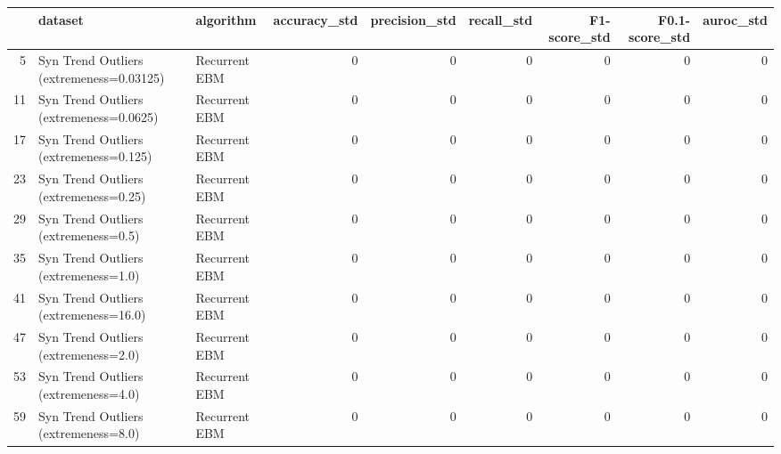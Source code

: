 \begin{tabular}{rllrrrrrr}
\hline
    & dataset                                  & algorithm     &   accuracy\_std &   precision\_std &   recall\_std &   F1-score\_std &   F0.1-score\_std &   auroc\_std \\
\hline
  5 & Syn Trend Outliers (extremeness=0.03125) & Recurrent EBM &              0 &               0 &            0 &              0 &                0 &           0 \\
 11 & Syn Trend Outliers (extremeness=0.0625)  & Recurrent EBM &              0 &               0 &            0 &              0 &                0 &           0 \\
 17 & Syn Trend Outliers (extremeness=0.125)   & Recurrent EBM &              0 &               0 &            0 &              0 &                0 &           0 \\
 23 & Syn Trend Outliers (extremeness=0.25)    & Recurrent EBM &              0 &               0 &            0 &              0 &                0 &           0 \\
 29 & Syn Trend Outliers (extremeness=0.5)     & Recurrent EBM &              0 &               0 &            0 &              0 &                0 &           0 \\
 35 & Syn Trend Outliers (extremeness=1.0)     & Recurrent EBM &              0 &               0 &            0 &              0 &                0 &           0 \\
 41 & Syn Trend Outliers (extremeness=16.0)    & Recurrent EBM &              0 &               0 &            0 &              0 &                0 &           0 \\
 47 & Syn Trend Outliers (extremeness=2.0)     & Recurrent EBM &              0 &               0 &            0 &              0 &                0 &           0 \\
 53 & Syn Trend Outliers (extremeness=4.0)     & Recurrent EBM &              0 &               0 &            0 &              0 &                0 &           0 \\
 59 & Syn Trend Outliers (extremeness=8.0)     & Recurrent EBM &              0 &               0 &            0 &              0 &                0 &           0 \\
\hline
\end{tabular}

